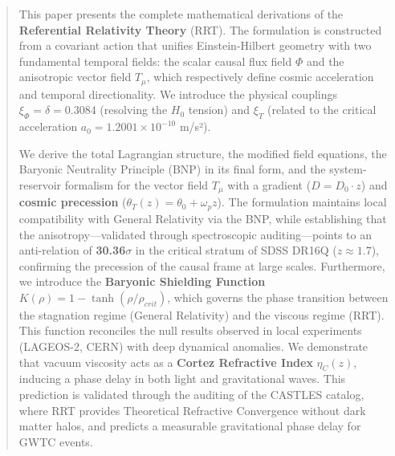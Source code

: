 \documentclass[10pt, a4paper]{article}
\begin{document}
\thispagestyle{empty}
\vspace*{\fill}
\begin{abstract}
\noindent This paper presents the complete mathematical derivations of the \textbf{Referential Relativity Theory} (RRT). The formulation is constructed from a covariant action that unifies Einstein-Hilbert geometry with two fundamental temporal fields: the scalar causal flux field $\Phi$ and the anisotropic vector field $T_\mu$, which respectively define cosmic acceleration and temporal directionality. We introduce the physical couplings $\xi_\Phi = \delta = 0.3084$ (resolving the $H_0$ tension) and $\xi_T$ (related to the critical acceleration $a_0 = 1.2001 \times 10^{-10}$ m/s²). 

We derive the total Lagrangian structure, the modified field equations, the Baryonic Neutrality Principle (BNP) in its final form, and the system-reservoir formalism for the vector field $T_\mu$ with a gradient ($D = D_0 \cdot z$) and \textbf{cosmic precession} ($\theta_T(z) = \theta_0 + \omega_p z$). The formulation maintains local compatibility with General Relativity via the BNP, while establishing that the anisotropy—validated through spectroscopic auditing—points to an anti-relation of \textbf{30.36$\sigma$} in the critical stratum of SDSS DR16Q ($z \approx 1.7$), confirming the precession of the causal frame at large scales. Furthermore, we introduce the \textbf{Baryonic Shielding Function} $K(\rho) = 1 - \tanh(\rho/\rho_{crit})$, which governs the phase transition between the stagnation regime (General Relativity) and the viscous regime (RRT). This function reconciles the null results observed in local experiments (LAGEOS-2, CERN) with deep dynamical anomalies. We demonstrate that vacuum viscosity acts as a \textbf{Cortez Refractive Index} $\eta_C(z)$, inducing a phase delay in both light and gravitational waves. This prediction is validated through the auditing of the CASTLES catalog, where RRT provides Theoretical Refractive Convergence without dark matter halos, and predicts a measurable gravitational phase delay for GWTC events.
\end{abstract}
\end{document}
